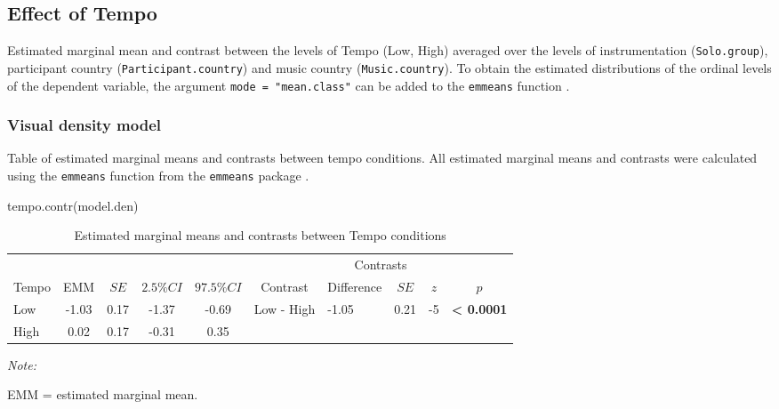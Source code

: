 \documentclass[
  bookmarksnumbered]{article}
\newenvironment{Shaded}{\begin{snugshade}}{\end{snugshade}}
\newcommand{\FunctionTok}[1]{\textcolor[rgb]{0.94,0.94,0.56}{#1}}
\newcommand{\NormalTok}[1]{\textcolor[rgb]{0.80,0.80,0.80}{#1}}
\begin{document}
\hypertarget{effect-of-tempo}{%
\subsection{Effect of Tempo}\label{effect-of-tempo}}

Estimated marginal mean and contrast between the levels of Tempo (Low, High) averaged over the levels of instrumentation (\texttt{Solo.group}), participant country (\texttt{Participant.country}) and music country (\texttt{Music.country}). To obtain the estimated distributions of the ordinal levels of the dependent variable, the argument \texttt{mode\ =\ "mean.class"} can be added to the \texttt{emmeans} function \autocite[see][]{532079}.

\hypertarget{visual-density-model}{%
\subsubsection{Visual density model}\label{visual-density-model}}

Table of estimated marginal means and contrasts between tempo conditions. All estimated marginal means and contrasts were calculated using the \texttt{emmeans} function from the \texttt{emmeans} package \autocite{emmeanscit}.

\begin{Shaded}
\begin{Highlighting}[]
\FunctionTok{tempo.contr}\NormalTok{(model.den)}
\end{Highlighting}
\end{Shaded}

\begin{table}[H]

\caption{\label{tab:tab-den-emms}Estimated marginal means and contrasts between Tempo conditions}
\centering
\begin{threeparttable}
\begin{tabular}[t]{lccccclccc}
\toprule
\multicolumn{5}{c}{ } & \multicolumn{5}{c}{Contrasts} \\
\cmidrule(l{3pt}r{3pt}){6-10}
Tempo & EMM & $SE$ & $2.5\% CI$ & $97.5\% CI$ & Contrast & Difference & $SE$ & $z$ & $p$\\
\midrule
Low & -1.03 & 0.17 & -1.37 & -0.69 & Low - High & -1.05 & 0.21 & -5 & \textbf{< 0.0001}\\
High & 0.02 & 0.17 & -0.31 & 0.35 &  &  &  &  & \\
\bottomrule
\end{tabular}
\begin{tablenotes}[para]
\item \textit{Note: } 
\item EMM = estimated marginal mean.
\end{tablenotes}
\end{threeparttable}
\end{table}
\end{document}
